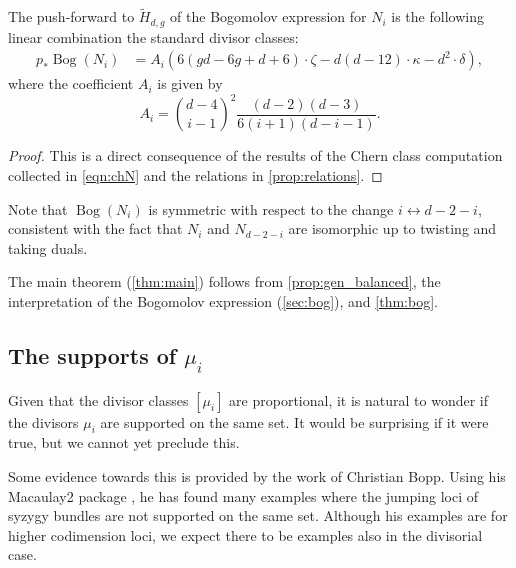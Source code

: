 \documentclass{amsart}
\DeclareMathOperator{\Bog}{Bog}
\numberwithin{equation}{section}
\begin{document}
\begin{theorem}
  \label{thm:bog}
  The push-forward to $\widetilde H_{d,g}$ of the Bogomolov expression for $N_i$ is the following linear combination the standard divisor classes: 
  \begin{align*}
    p_* \Bog(N_i) &= A_i \left(6(gd-6g+d+6) \cdot \zeta - d(d-12)\cdot \kappa - d^2 \cdot \delta \right),
  \end{align*}
  where the coefficient $A_i$ is given by
  \[ A_i = {{d-4} \choose {i-1}}^2 \frac{(d-2)(d-3)}{6(i+1)(d-i-1)}.\]
\end{theorem}
\begin{proof}
  This is a direct consequence of the results of the Chern class computation collected in \eqref{eqn:chN} and the relations in \autoref{prop:relations}.
\end{proof}
Note that $\Bog(N_i)$ is symmetric with respect to the change $i \leftrightarrow d-2-i$, consistent with the fact that $N_i$ and $N_{d-2-i}$ are isomorphic up to twisting and taking duals.

The main theorem (\autoref{thm:main}) follows from \autoref{prop:gen_balanced}, the interpretation of the Bogomolov expression (\autoref{sec:bog}), and \autoref{thm:bog}.

\subsection{The supports of $\mu_i$}\label{sec:supports}
Given that the divisor classes $[\mu_{i}]$ are proportional, it is natural to wonder if the divisors $\mu_i$ are supported on the same set.
It would be surprising if it were true, but we cannot yet preclude this. 

Some evidence towards this is provided by the work of Christian Bopp.
Using his Macaulay2 package \cite{bop.hof:}, he has found many examples where the jumping loci of syzygy bundles are not supported on the same set.
Although his examples are for higher codimension loci, we expect there to be examples also in the divisorial case.
\end{document}
